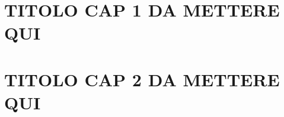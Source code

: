 \documentclass[a4paper,twoside]{book}
\begin{document}
     


\chapter{TITOLO CAP 1 DA METTERE QUI}


\chapter{TITOLO CAP 2 DA METTERE QUI}



\end{document}
